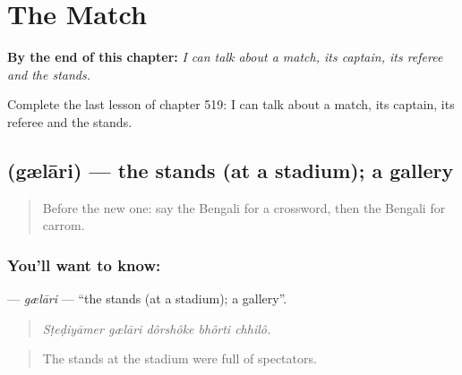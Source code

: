 
\chapter{The Match}
\label{ch:bn-the-match}

\begin{chapteropening}
\textbf{By the end of this chapter:} \emph{I can talk about a match, its captain, its referee and the stands.}

Complete the last lesson of chapter 519: I can talk about a match, its captain, its referee and the stands.
\end{chapteropening}

\section[\texorpdfstring{\bn{গ্যালারি} (gælāri)}{গ্যালারি (gælāri)}]{ (gælāri) — the stands (at a stadium); a gallery}

\label{lesson:BN-C519-gelari}



\begin{quote}
Before the new one: say the Bengali for a crossword, then the Bengali for carrom.
\end{quote}

\subsection*{You'll want to know: }
\textbf{} — \emph{gælāri} — \textquotedblleft{}the stands (at a stadium); a gallery\textquotedblright{}.

\begin{quote}
    
\end{quote}

\begin{quote}
\emph{Sṭeḍiyāmer gælāri dôrshôke bhôrti chhilô.}
\end{quote}

\begin{quote}
The stands at the stadium were full of spectators.
\end{quote}

